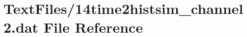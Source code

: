 \hypertarget{14time2histsim__channel2_8dat}{}\section{Text\+Files/14time2histsim\+\_\+channel2.dat File Reference}
\label{14time2histsim__channel2_8dat}
